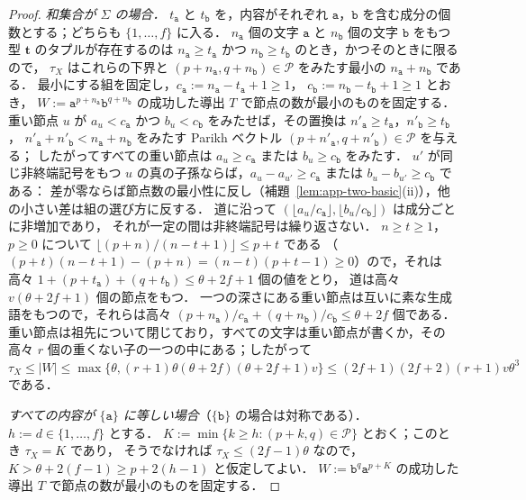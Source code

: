 \begin{proof}
\emph{和集合が $\Sigma$ の場合．}
$t_{\mathtt a}$ と $t_{\mathtt b}$ を，内容がそれぞれ $\mathtt a$，$\mathtt b$ を含む成分の個数とする；どちらも $\{1,\dots,f\}$ に入る．
$n_{\mathtt a}$ 個の文字 $\mathtt a$ と $n_{\mathtt b}$ 個の文字 $\mathtt b$ をもつ型 $\mathbf t$ のタプルが存在するのは
$n_{\mathtt a}\ge t_{\mathtt a}$ かつ $n_{\mathtt b}\ge t_{\mathtt b}$ のとき，かつそのときに限るので，
$\tau_X$ はこれらの下界と $(p+n_{\mathtt a},q+n_{\mathtt b})\in\mathcal P$ をみたす最小の $n_{\mathtt a}+n_{\mathtt b}$ である．
最小にする組を固定し，$c_{\mathtt a}:=n_{\mathtt a}-t_{\mathtt a}+1\ge1$，
$c_{\mathtt b}:=n_{\mathtt b}-t_{\mathtt b}+1\ge1$ とおき，
$W:=\mathtt a^{p+n_{\mathtt a}}\mathtt b^{q+n_{\mathtt b}}$ の成功した導出 $T$ で節点の数が最小のものを固定する．
重い節点 $u$ が $a_u<c_{\mathtt a}$ かつ $b_u<c_{\mathtt b}$ をみたせば，その置換は
$n'_{\mathtt a}\ge t_{\mathtt a}$，$n'_{\mathtt b}\ge t_{\mathtt b}$，
$n'_{\mathtt a}+n'_{\mathtt b}<n_{\mathtt a}+n_{\mathtt b}$ をみたす Parikh ベクトル $(p+n'_{\mathtt a},q+n'_{\mathtt b})\in\mathcal P$ を与える；
したがってすべての重い節点は $a_u\ge c_{\mathtt a}$ または $b_u\ge c_{\mathtt b}$ をみたす．
$u'$ が同じ非終端記号をもつ $u$ の真の子孫ならば，$a_u-a_{u'}\ge c_{\mathtt a}$ または $b_u-b_{u'}\ge c_{\mathtt b}$ である：
差が零ならば節点数の最小性に反し（補題~\ref{lem:app-two-basic}(ii)），他の小さい差は組の選び方に反する．
道に沿って $(\lfloor a_u/c_{\mathtt a}\rfloor,\lfloor b_u/c_{\mathtt b}\rfloor)$ は成分ごとに非増加であり，
それが一定の間は非終端記号は繰り返さない．
$n\ge t\ge1$，$p\ge0$ について $\lfloor(p+n)/(n-t+1)\rfloor\le p+t$ である
（$(p+t)(n-t+1)-(p+n)=(n-t)(p+t-1)\ge0$）ので，それは高々 $1+(p+t_{\mathtt a})+(q+t_{\mathtt b})\le\theta+2f+1$ 個の値をとり，
道は高々 $v(\theta+2f+1)$ 個の節点をもつ．
一つの深さにある重い節点は互いに素な生成語をもつので，それらは高々
$(p+n_{\mathtt a})/c_{\mathtt a}+(q+n_{\mathtt b})/c_{\mathtt b}\le\theta+2f$ 個である．
重い節点は祖先について閉じており，すべての文字は重い節点が書くか，その高々 $r$ 個の重くない子の一つの中にある；したがって
$\tau_X\le|W|\le\max\{\theta,(r+1)\theta(\theta+2f)(\theta+2f+1)v\}\le(2f+1)(2f+2)(r+1)v\theta^3$ である．

\emph{すべての内容が $\{\mathtt a\}$ に等しい場合}（$\{\mathtt b\}$ の場合は対称である）．$h:=d\in\{1,\dots,f\}$ とする．
$K:=\min\{k\ge h:(p+k,q)\in\mathcal P\}$ とおく；このとき $\tau_X=K$ であり，
そうでなければ $\tau_X\le(2f-1)\theta$ なので，$K>\theta+2(f-1)\ge p+2(h-1)$ と仮定してよい．
$W:=\mathtt b^q\mathtt a^{p+K}$ の成功した導出 $T$ で節点の数が最小のものを固定する．


\end{proof}
